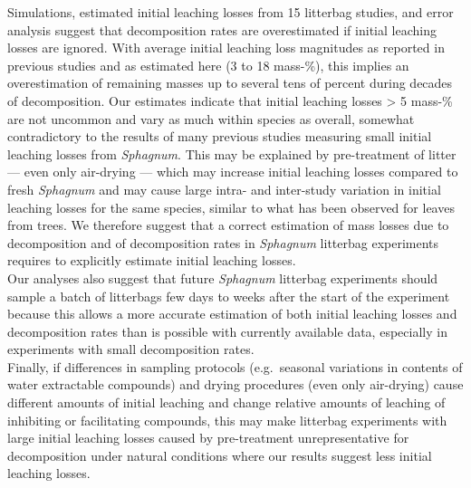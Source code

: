\documentclass[bg, manuscript]{copernicus}
\begin{document}
\conclusions[Conclusions]

Simulations, estimated initial leaching losses from 15 litterbag studies, and error analysis suggest that decomposition rates are overestimated if initial leaching losses are ignored. With average initial leaching loss magnitudes as reported in previous studies and as estimated here (3 to 18 mass-\%), this implies an overestimation of remaining masses up to several tens of percent during decades of decomposition.
Our estimates indicate that initial leaching losses \textgreater{} 5 mass-\% are not uncommon and vary as much within species as overall, somewhat contradictory to the results of many previous studies measuring small initial leaching losses from \emph{Sphagnum}. This may be explained by pre-treatment of litter --- even only air-drying --- which may increase initial leaching losses compared to fresh \emph{Sphagnum} and may cause large intra- and inter-study variation in initial leaching losses for the same species, similar to what has been observed for leaves from trees. We therefore suggest that a correct estimation of mass losses due to decomposition and of decomposition rates in \emph{Sphagnum} litterbag experiments requires to explicitly estimate initial leaching losses.\\
Our analyses also suggest that future \emph{Sphagnum} litterbag experiments should sample a batch of litterbags few days to weeks after the start of the experiment because this allows a more accurate estimation of both initial leaching losses and decomposition rates than is possible with currently available data, especially in experiments with small decomposition rates.\\
Finally, if differences in sampling protocols (e.g.~seasonal variations in contents of water extractable compounds) and drying procedures (even only air-drying) cause different amounts of initial leaching and change relative amounts of leaching of inhibiting or facilitating compounds, this may make litterbag experiments with large initial leaching losses caused by pre-treatment unrepresentative for decomposition under natural conditions where our results suggest less initial leaching losses.



\end{document}
